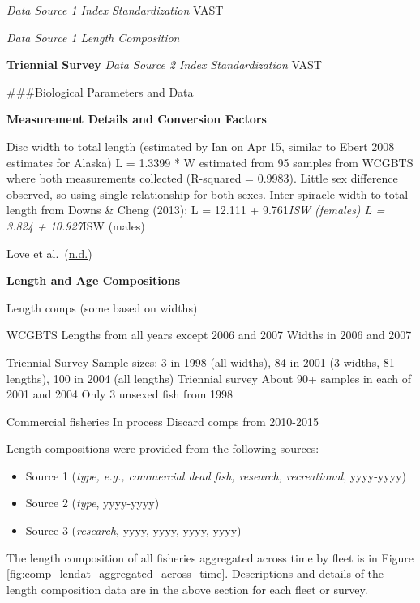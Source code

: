 \documentclass[12pt,]{article}
\begin{document}
\emph{Data Source 1 Index Standardization} VAST

\emph{Data Source 1 Length Composition}

\textbf{Triennial Survey} \emph{Data Source 2 Index Standardization}
VAST

\newpage

\#\#\#Biological Parameters and Data

\textbf{Measurement Details and Conversion Factors}

Disc width to total length (estimated by Ian on Apr 15, similar to Ebert
2008 estimates for Alaska) L = 1.3399 * W estimated from 95 samples from
WCGBTS where both measurements collected (R-squared = 0.9983). Little
sex difference observed, so using single relationship for both sexes.
Inter-spiracle width to total length from Downs \& Cheng (2013): L =
12.111 + 9.761\emph{ISW (females) L = 3.824 + 10.927}ISW (males)

Love et al.~(\protect\hyperlink{ref-Love1987}{n.d.})

\textbf{Length and Age Compositions}

Length comps (some based on widths)

WCGBTS Lengths from all years except 2006 and 2007 Widths in 2006 and
2007

Triennial Survey Sample sizes: 3 in 1998 (all widths), 84 in 2001 (3
widths, 81 lengths), 100 in 2004 (all lengths) Triennial survey About
90+ samples in each of 2001 and 2004 Only 3 unsexed fish from 1998

Commercial fisheries In process Discard comps from 2010-2015

Length compositions were provided from the following sources:

\begin{itemize}[noitemsep,nolistsep,topsep=0pt]
  \item Source 1 (\emph{type, e.g., commercial dead fish, research, recreational}, yyyy-yyyy)    
  \item Source 2 (\emph{type}, yyyy-yyyy)    
  \item Source 3 (\emph{research}, yyyy, yyyy, yyyy, yyyy) 
\end{itemize}

The length composition of all fisheries aggregated across time by fleet
is in Figure \ref{fig:comp_lendat_aggregated_across_time}. Descriptions
and details of the length composition data are in the above section for
each fleet or survey.

\vspace{.5cm}
\end{document}
